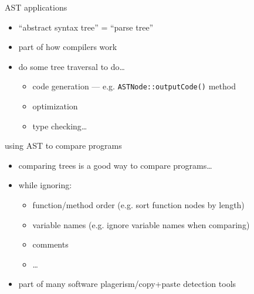 \begin{frame}{AST applications}
\begin{itemize}
\item ``abstract syntax tree'' = ``parse tree''
\item part of how compilers work
\item do some tree traversal to do\ldots
    \begin{itemize}
        \item code generation --- e.g. \texttt{ASTNode::outputCode()} method
        \item optimization
        \item type checking\ldots
    \end{itemize}
\end{itemize}
\end{frame}

\begin{frame}{using AST to compare programs}
    \begin{itemize}
        \item comparing trees is a good way to compare programs\ldots
        \item while ignoring:
            \begin{itemize}
            \item function/method order (e.g. sort function nodes by length)
            \item variable names (e.g. ignore variable names when comparing)
            \item comments
            \item \ldots
            \end{itemize}
        \vspace{.5cm}
        \item part of many software plagerism/copy+paste detection tools
    \end{itemize}
\end{frame}
